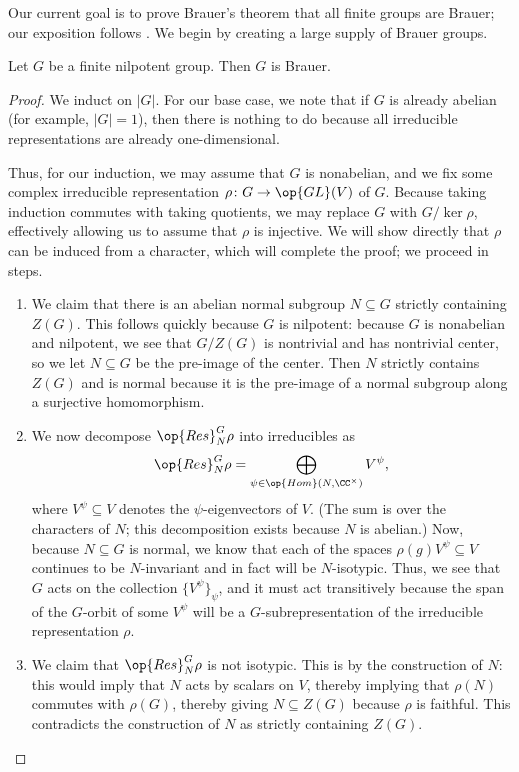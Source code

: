 \documentclass[../thesis.tex]{subfiles}
\begin{document}
Our current goal is to prove Brauer's theorem that all finite groups are Brauer; our exposition follows \cite[Chapter~10]{serre-rep-theory}. We begin by creating a large supply of Brauer groups.
\begin{lemma} \label{lem:nilpotent-is-brauer}
	Let $G$ be a finite nilpotent group. Then $G$ is Brauer.
\end{lemma}
\begin{proof}
	We induct on $\left|G\right|$. For our base case, we note that if $G$ is already abelian (for example, $\left|G\right|=1$), then there is nothing to do because all irreducible representations are already one-dimensional.

	Thus, for our induction, we may assume that $G$ is nonabelian, and we fix some complex irreducible representation $\rho\colon G\to\op{GL}(V)$ of $G$. Because taking induction commutes with taking quotients, we may replace $G$ with $G/\ker\rho$, effectively allowing us to assume that $\rho$ is injective. We will show directly that $\rho$ can be induced from a character, which will complete the proof; we proceed in steps.
	\begin{enumerate}
		\item We claim that there is an abelian normal subgroup $N\subseteq G$ strictly containing $Z(G)$. This follows quickly because $G$ is nilpotent: because $G$ is nonabelian and nilpotent, we see that $G/Z(G)$ is nontrivial and has nontrivial center, so we let $N\subseteq G$ be the pre-image of the center. Then $N$ strictly contains $Z(G)$ and is normal because it is the pre-image of a normal subgroup along a surjective homomorphism.

		\item We now decompose $\op{Res}^G_N\rho$ into irreducibles as
		\[\op{Res}^G_N\rho=\bigoplus_{\psi\in\op{Hom}(N,\CC^\times)}V^\psi,\]
		where $V^\psi\subseteq V$ denotes the $\psi$-eigenvectors of $V$. (The sum is over the characters of $N$; this decomposition exists because $N$ is abelian.) Now, because $N\subseteq G$ is normal, we know that each of the spaces $\rho(g)V^\psi\subseteq V$ continues to be $N$-invariant and in fact will be $N$-isotypic. Thus, we see that $G$ acts on the collection $\{V^\psi\}_\psi$, and it must act transitively because the span of the $G$-orbit of some $V^\psi$ will be a $G$-subrepresentation of the irreducible representation $\rho$.

		\item We claim that $\op{Res}^G_N\rho$ is not isotypic. This is by the construction of $N$: this would imply that $N$ acts by scalars on $V$, thereby implying that $\rho(N)$ commutes with $\rho(G)$, thereby giving $N\subseteq Z(G)$ because $\rho$ is faithful. This contradicts the construction of $N$ as strictly containing $Z(G)$.


\end{enumerate}
\end{proof}
\end{document}
